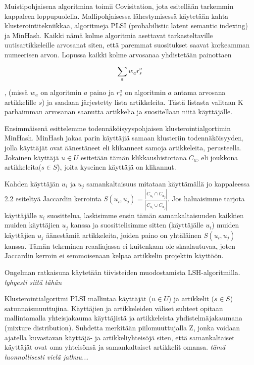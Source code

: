 \documentclass[12pt,finnish]{tktltiki2}
\theoremstyle{definition}
\theoremstyle{remark}
\begin{document}
Muistipohjaisena algoritmina toimii Covisitation, jota esitellään tarkemmin kappaleen loppupuolella. Mallipohjaisessa lähestymisessä käytetään kahta klusterointitekniikkaa, algoritmeja PLSI (probabilistic latent semantic indexing) ja MinHash. Kaikki nämä kolme algoritmia asettavat tarkasteltaville uutisartikkeleille arvosanat siten, että paremmat suositukset saavat korkeamman numeerisen arvon. Lopussa kaikki kolme arvosanaa yhdistetään painottaen

\begin{displaymath}
\sum_a{w_a r^{a}_{s}}
\end{displaymath}

, (missä $w_a$ on algoritmin $a$ paino ja $r^{a}_{s}$ on algoritmin $a$ antama arvosana artikkelille $s$) ja saadaan järjestetty lista artikkeleita. Tästä listasta valitaan K parhaimman arvosanan saanutta artikkelia ja suositellaan niitä käyttäjälle.

Ensimmäisenä esittelemme todennäköisyyspohjaisen klusterointialgortimin MinHash. MinHash jakaa parin käyttäjiä samaan klusteriin todennäköisyyden, jolla käyttäjät ovat äänestäneet eli klikanneet samoja artikkeleita, perusteella. Jokainen käyttäjä $u \in U$ esitetään tämän klikkaushistoriana $C_u$, eli joukkona artikkeleita($s \in S$), joita kyseinen käyttäjä on klikannut.

Kahden käyttäjän $u_i$ ja $u_j$ samankaltaisuus mitataan käyttämällä jo kappaleessa 2.2 esiteltyä Jaccardin kerrointa $S(u_i, u_j) = \frac{|C_{u_{i}} \cap C_{u_{j}}|}{|C_{u_{i}} \cup C_{u_{j}}|}$. Jos haluaisimme tarjota käyttäjälle $u_i$ suosittelua, laskisimme ensin tämän samankaltaisuuden kaikkien muiden käyttäjien $u_j$ kanssa ja suosittelisimme sitten (käyttäjälle $u_i$) muiden käyttäjien $u_j$ äänestämiä artikkeleita, joiden paino on yhtäläinen $S(u_i, u_j)$ kanssa. Tämän tekeminen reaaliajassa ei kuitenkaan ole skaalautuvaa, joten Jaccardin kerroin ei semmoisenaan kelpaa artikkelin projektin käyttöön.

Ongelman ratkaisuna käytetään tiivisteiden muodostamista LSH-algoritmilla. \textit{lyhyesti siitä tähän}

Klusterointialgoritmi PLSI mallintaa käyttäjät ($u \in U$) ja artikkelit ($s \in S$) satunnaismuuttujina.
Käyttäjien ja artikkeleiden väliset suhteet opitaan mallintamalla yhteisjakauma käyttäjistä ja artikkeleista yhdistelmäjakaumana (mixture distribution).
Suhdetta merkitään piilomuuttujalla Z, jonka voidaan ajatella kuvastavan käyttäjä- ja artikkeliyhteisöjä siten, että samankaltaiset käyttäjät ovat oma yhteisönsä ja samankaltaiset artikkelit omansa. \textit{tämä luonnollisesti vielä jatkuu...}
\end{document}
